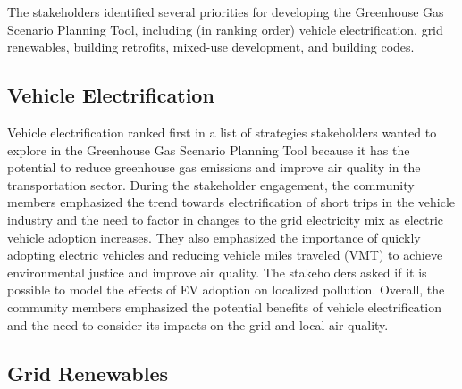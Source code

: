 \documentclass[
]{book}
\begin{document}
The stakeholders identified several priorities for developing the Greenhouse Gas Scenario Planning Tool, including (in ranking order) vehicle electrification, grid renewables, building retrofits, mixed-use development, and building codes.

\hypertarget{vehicle-electrification}{%
\subsection{Vehicle Electrification}\label{vehicle-electrification}}

Vehicle electrification ranked first in a list of strategies stakeholders wanted to explore in the Greenhouse Gas Scenario Planning Tool because it has the potential to reduce greenhouse gas emissions and improve air quality in the transportation sector. During the stakeholder engagement, the community members emphasized the trend towards electrification of short trips in the vehicle industry and the need to factor in changes to the grid electricity mix as electric vehicle adoption increases. They also emphasized the importance of quickly adopting electric vehicles and reducing vehicle miles traveled (VMT) to achieve environmental justice and improve air quality. The stakeholders asked if it is possible to model the effects of EV adoption on localized pollution. Overall, the community members emphasized the potential benefits of vehicle electrification and the need to consider its impacts on the grid and local air quality.

\hypertarget{grid-renewables}{%
\subsection{Grid Renewables}\label{grid-renewables}}
\end{document}
